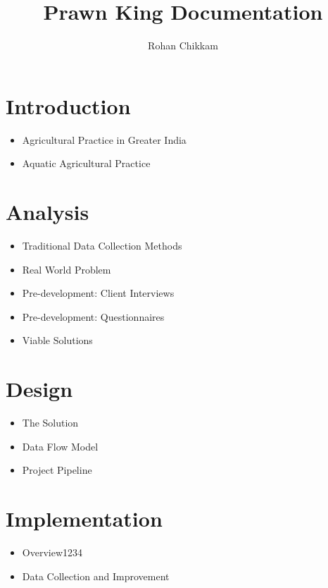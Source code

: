 \documentclass[a4paper,11pt]{proc}
\title{Prawn King Documentation}
\author{Rohan Chikkam}
\begin{document}
\begin{titlepage}

\maketitle
\end{titlepage}

\section{Introduction}

    \begin{itemize}
      \item Agricultural Practice in Greater India
      \item Aquatic Agricultural Practice
    \end{itemize}

\section{Analysis}

    \begin{itemize}
      \item Traditional Data Collection Methods
      \item Real World Problem
      \item Pre-development: Client Interviews
      \item Pre-development: Questionnaires
      \item Viable Solutions
    \end{itemize}

\section{Design}

    \begin{itemize}
      \item The Solution
      \item Data Flow Model
      \item Project Pipeline
    \end{itemize}

\section{Implementation}
    
    \begin{itemize}
      \item Overview1234
      \item Data Collection and Improvement
    \end{itemize}
\end{document}
